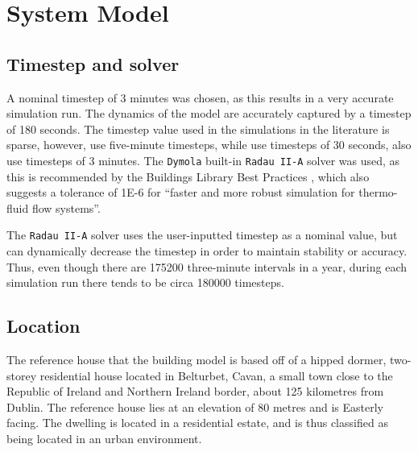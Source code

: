 \chapter{System Model}\label{ch:model} 


\section{Timestep and solver}
A nominal timestep of 3 minutes was chosen, as this results in a very accurate simulation run. The dynamics of the model are accurately captured by a timestep of 180 seconds. The timestep value used in the simulations in the literature is sparse, however, \citeauthor{roccatello_analysis_2022} \cite{roccatello_analysis_2022} use five-minute timesteps, while \citeauthor{dongellini_influence_2021} \cite{dongellini_influence_2021} use timesteps of 30 seconds, \citeauthor{klein_numerical_2014} \cite{klein_numerical_2014} also use timesteps of 3 minutes. The \texttt{Dymola} built-in \texttt{Radau II-A} solver was used, as this is recommended by the Buildings Library Best Practices \cite{lawrence_berkeley_national_laboratory_user_2022}, which also suggests a tolerance of \num{1E-6} for ``faster and more robust simulation for thermo-fluid flow systems''. 

The \texttt{Radau II-A} solver uses the user-inputted timestep as a nominal value, but can dynamically decrease the timestep in order to maintain stability or accuracy. Thus, even though there are \num{175200} three-minute intervals in a year, during each simulation run there tends to be circa \num{180000} timesteps. 

\section{Location} \label{sec:location}
The reference house that the building model is based off of a hipped dormer, two-storey residential house located in Belturbet, Cavan, a small town close to the Republic of Ireland and Northern Ireland border, about 125 kilometres from Dublin. The reference house lies at an elevation of 80 metres and is Easterly facing. The dwelling is located in a residential estate, and is thus classified as being located in an urban environment.

